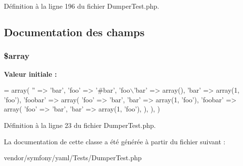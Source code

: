 Définition à la ligne 196 du fichier Dumper\+Test.\+php.



\subsection{Documentation des champs}
\subsubsection[{\texorpdfstring{\$array}{$array}}]{\setlength{\rightskip}{0pt plus 5cm}\$array\hspace{0.3cm}{\ttfamily [protected]}}\hypertarget{class_symfony_1_1_component_1_1_yaml_1_1_tests_1_1_dumper_test_ac1361b8d873c1f927b21b809f99e5752}{}\label{class_symfony_1_1_component_1_1_yaml_1_1_tests_1_1_dumper_test_ac1361b8d873c1f927b21b809f99e5752}
{\bfseries Valeur initiale \+:}
\begin{DoxyCode}
= array(
        \textcolor{stringliteral}{''} => \textcolor{stringliteral}{'bar'},
        \textcolor{stringliteral}{'foo'} => \textcolor{stringliteral}{'#bar'},
        \textcolor{stringliteral}{'foo\(\backslash\)'bar'} => array(),
        \textcolor{stringliteral}{'bar'} => array(1, \textcolor{stringliteral}{'foo'}),
        \textcolor{stringliteral}{'foobar'} => array(
            \textcolor{stringliteral}{'foo'} => \textcolor{stringliteral}{'bar'},
            \textcolor{stringliteral}{'bar'} => array(1, \textcolor{stringliteral}{'foo'}),
            \textcolor{stringliteral}{'foobar'} => array(
                \textcolor{stringliteral}{'foo'} => \textcolor{stringliteral}{'bar'},
                \textcolor{stringliteral}{'bar'} => array(1, \textcolor{stringliteral}{'foo'}),
            ),
        ),
    )
\end{DoxyCode}


Définition à la ligne 23 du fichier Dumper\+Test.\+php.



La documentation de cette classe a été générée à partir du fichier suivant \+:\begin{DoxyCompactItemize}
\item 
vendor/symfony/yaml/\+Tests/Dumper\+Test.\+php\end{DoxyCompactItemize}
